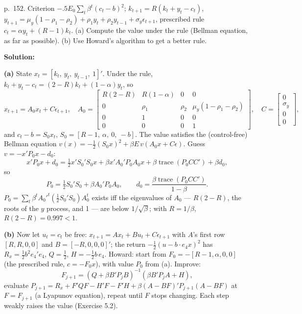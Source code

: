\documentclass[12pt, letterpaper]{article}
\newcommand{\tr}{\operatorname{trace}}
\begin{document}
\begin{tcolorbox}[evenbox,title={Exercise 5.10 \quad Valuing a rule of thumb, then improving it}]
\begin{tcolorbox}[questionbox]
p.~152. Criterion $-.5E_0\sum_t\beta^t(c_t-b)^2$; $k_{t+1}=R(k_t+y_t-c_t)$,
$y_{t+1}=\mu_y(1-\rho_1-\rho_2)+\rho_1y_t+\rho_2y_{t-1}+\sigma_y\epsilon_{t+1}$, prescribed rule
$c_t=\alpha y_t+(R-1)k_t$. (a) Compute the value under the rule (Bellman equation, as far as
possible). (b) Use Howard's algorithm to get a better rule.
\end{tcolorbox}

\textbf{Solution:}

\textbf{(a)} State $x_t=[k_t,\ y_t,\ y_{t-1},\ 1]'$. Under the rule,
$k_t+y_t-c_t=(2-R)k_t+(1-\alpha)y_t$, so
\[
x_{t+1}=A_0x_t+C\epsilon_{t+1},\quad
A_0=\begin{bmatrix}R(2-R)&R(1-\alpha)&0&0\\0&\rho_1&\rho_2&\mu_y(1-\rho_1-\rho_2)\\0&1&0&0\\0&0&0&1\end{bmatrix},\quad
C=\begin{bmatrix}0\\\sigma_y\\0\\0\end{bmatrix},
\]
and $c_t-b=S_0x_t$, $S_0=[R-1,\ \alpha,\ 0,\ -b]$. The value satisfies the (control-free) Bellman
equation $v(x)=-\tfrac12(S_0x)^2+\beta E\,v(A_0x+C\epsilon)$. Guess $v=-x'P_0x-d_0$:
\[
x'P_0x+d_0=\tfrac12x'S_0'S_0x+\beta x'A_0'P_0A_0x+\beta\tr(P_0CC')+\beta d_0,
\]
so
\[
P_0=\tfrac12S_0'S_0+\beta A_0'P_0A_0,\qquad d_0=\frac{\beta\tr(P_0CC')}{1-\beta}.
\]
$P_0=\sum_t\beta^tA_0'^t(\tfrac12S_0'S_0)A_0^t$ exists iff the eigenvalues of $A_0$ --- $R(2-R)$,
the roots of the $y$ process, and 1 --- are below $1/\sqrt\beta$; with $R=1/\beta$,
$R(2-R)=0.997<1$.

\textbf{(b)} Now let $u_t=c_t$ be free: $x_{t+1}=Ax_t+Bu_t+C\epsilon_{t+1}$ with $A$'s first row
$[R,R,0,0]$ and $B=[-R,0,0,0]'$; the return $-\tfrac12(u-b\cdot e_4x)^2$ has $R_x=\tfrac12b^2e_4'e_4$,
$Q=\tfrac12$, $H=-\tfrac12b\,e_4$. Howard: start from $F_0=-[R-1,\alpha,0,0]$ (the prescribed rule,
$c=-F_0x$), with value $P_0$ from (a). Improve:
\[
F_{j+1}=(Q+\beta B'P_jB)^{-1}(\beta B'P_jA+H),
\]
evaluate $P_{j+1}=R_x+F'QF-H'F-F'H+\beta(A-BF)'P_{j+1}(A-BF)$ at $F=F_{j+1}$ (a Lyapunov equation),
repeat until $F$ stops changing. Each step weakly raises the value (Exercise 5.2).


\end{tcolorbox}
\end{document}
